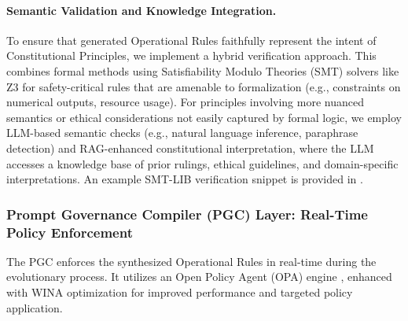 \documentclass[manuscript,screen,review,anonymous,9pt]{acmart}
\begin{document}
\paragraph{Semantic Validation and Knowledge Integration.}
\label{subsubsec:semantic_validation}
To ensure that generated Operational Rules faithfully represent the intent of Constitutional Principles, we implement a hybrid verification approach. This combines formal methods using Satisfiability Modulo Theories (SMT) solvers like Z3 \cite{Barrett2018SMTSolving, DeMouraZ3} for safety-critical rules that are amenable to formalization (e.g., constraints on numerical outputs, resource usage). For principles involving more nuanced semantics or ethical considerations not easily captured by formal logic, we employ LLM-based semantic checks (e.g., natural language inference, paraphrase detection) and RAG-enhanced constitutional interpretation, where the LLM accesses a knowledge base of prior rulings, ethical guidelines, and domain-specific interpretations. An example SMT-LIB verification snippet is provided in .

\subsubsection{Prompt Governance Compiler (PGC) Layer: Real-Time Policy Enforcement}
\label{subsubsec:pgc_layer}
The PGC enforces the synthesized Operational Rules in real-time during the evolutionary process. It utilizes an Open Policy Agent (OPA) engine \cite{Sandall2021OPAReference}, enhanced with WINA optimization for improved performance and targeted policy application.
\end{document}
